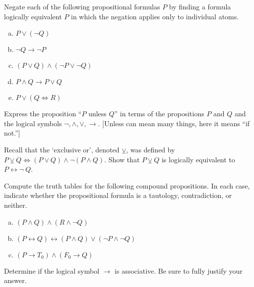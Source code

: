 \documentclass[11pt,letterpaper]{article}
\begin{document}
\newpage



 Negate each of the following propositional formulas $P$ by finding a formula logically equivalent $P$ in which the negation applies only to individual atoms. 
	\begin{enumerate}[(a)]
	\item $P \vee (\neg Q)$
	\item $\neg Q \to \neg P$
	\item $(P \vee Q) \wedge (\neg P \vee \neg Q)$
	\item $P \wedge Q \to P \vee Q$
	\item $P \vee (Q \Leftrightarrow R)$
	\end{enumerate}



\newpage



 Express the proposition ``$P$ unless $Q$'' in terms of the propositions $P$ and $Q$ and the logical symbols $\neg, \wedge, \vee, \to$. [Unless can mean many things, here it means ``if not.'']



\newpage



 Recall that the `exclusive or', denoted $\veebar$, was defined by $P \veebar Q \Leftrightarrow (P \vee Q) \wedge \neg (P \wedge Q)$. Show that $P \veebar Q$ is logically equivalent to $P \leftrightarrow \neg\ Q$.



\newpage



 Compute the truth tables for the following compound propositions. In each case, indicate whether the propositional formula is a tautology, contradiction, or neither. 
	\begin{enumerate}[(a)]
	\item $(P \wedge Q) \wedge (R \wedge \neg Q)$
	\item $(P \leftrightarrow Q) \leftrightarrow (P \wedge Q) \vee (\neg P \wedge \neg Q)$
	\item $(P \to T_0) \wedge (F_0 \to Q)$
	\end{enumerate}



\newpage



 Determine if the logical symbol $\to$ is associative. Be sure to fully justify your answer. 
\end{document}
